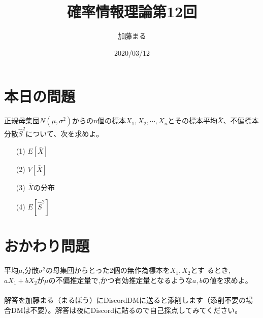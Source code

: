 \documentclass[a4j,uplatex,dvipdfmx]{jsarticle}
\title{確率情報理論第12回}
\author{加藤まる}
\date{2020/03/12}
\begin{document}
\maketitle

\section*{本日の問題}
正規母集団$N(\mu ,\sigma ^2)$からのn個の標本$X_1,X_2,\cdots ,X_n$とその標本平均$\bar{X}$、不偏標本分散$\hat{S}^2$について、次を求めよ。
\begin{itemize}
  \item[(1)] $E[\bar{X}]$
  \item[(2)] $V[\bar{X}]$
  \item[(3)] $\bar{X}$の分布
  \item[(4)] $E[\hat{S}^2]$   
\end{itemize}


\section*{おかわり問題}
平均$\mu$,分散$\sigma ^2$の母集団からとった2個の無作為標本を$X_1,X_2$とす
るとき,$aX_1+bX_2$が$\mu$の不偏推定量で,かつ有効推定量となるような$a,b$の値を求めよ。\\
\\
解答を加藤まる（まるぼう）にDiscordDMに送ると添削します（添削不要の場合DMは不要）。解答は夜にDiscordに貼るので自己採点してみてください。
\end{document}
